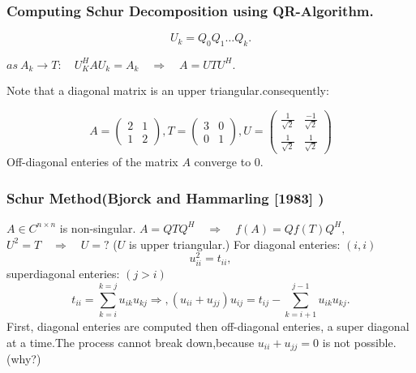 
\begin{frame}

\frametitle{Computing Schur Decomposition using QR-Algorithm.}

\[
U_k = Q_0 Q_1 \dots Q_k .
\]

$as \: A_k \rightarrow T: \quad U^H _K A U_k = A_k \quad \Longrightarrow  \quad A = UTU^H. $\newline \newline

Note that a diagonal matrix is an upper triangular.\newline consequently:

\[
    A=  \begin{pmatrix}
        2 & 1 \\
        1 & 2
    \end{pmatrix},
    T=  \begin{pmatrix}
        3 & 0 \\
        0 & 1
    \end{pmatrix},
    U = \begin{pmatrix}
        \frac {1} {\sqrt {2}} & \frac {-1} {\sqrt {2}} \\
        \frac {1} {\sqrt {2}} & \frac {1} {\sqrt {2}}
    \end{pmatrix}
\]
Off-diagonal enteries of the matrix $A$ converge to $0$.\newline
\end{frame}


\begin{frame}

\frametitle{Schur Method\newline (Bjorck and Hammarling [1983] )}
$A \in C^{n \times n}$ is non-singular.\newline
$A = QTQ^H \quad \Longrightarrow \quad f(A) = Qf(T)Q^H ,$\newline \newline
$U^2 = T \quad \Longrightarrow \quad U =? $ ($U$ is upper triangular.)\newline
For diagonal enteries: $(i,i)$
\[
 u_{ii} ^2 = t_{ii},
\]
superdiagonal enteries: $(j>i)$
\[
t_{ii} =\sum_{k=i}^{k=j}u_{ik}u_{kj} \Longrightarrow ,(u_{ii}+u_{jj})u_{ij} = t_{ij} - \sum_{k =i+1}^{j-1}u_{ik}u_{kj}.
\]
First, diagonal enteries are computed then off-diagonal enteries, a super diagonal at a time.The process cannot break down,because $u_{ii}+u_{jj}=0$ is not possible.(why?)
\end{frame}

